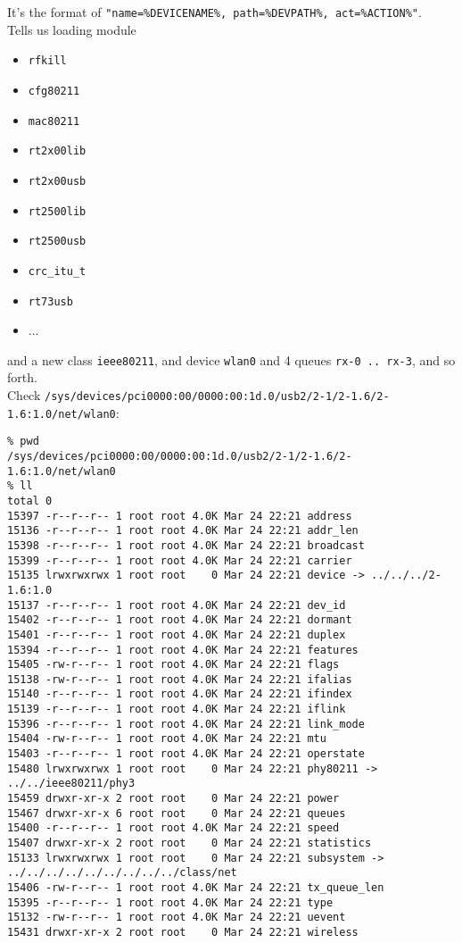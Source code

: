 \documentclass[a4paper]{report}
\begin{document}
It's the format of {\tt "name=\%DEVICENAME\%, path=\%DEVPATH\%, act=\%ACTION\%"}.\\
Tells us loading module 
\begin{itemize}
    \item {\tt rfkill}
    \item {\tt cfg80211}
    \item {\tt mac80211}
    \item {\tt rt2x00lib}
    \item {\tt rt2x00usb}
    \item {\tt rt2500lib}
    \item {\tt rt2500usb}
    \item {\tt crc\_itu\_t}
    \item {\tt rt73usb}
    \item ...
\end{itemize}
and a new class {\tt ieee80211}, and device {\tt wlan0} and 4 queues {\tt rx-0 .. rx-3}, and so forth.\\
Check {\tt /sys/devices/pci0000:00/0000:00:1d.0/usb2/2-1/2-1.6/2-1.6:1.0/net/wlan0}:
\begin{lstlisting}
% pwd
/sys/devices/pci0000:00/0000:00:1d.0/usb2/2-1/2-1.6/2-1.6:1.0/net/wlan0
% ll
total 0
15397 -r--r--r-- 1 root root 4.0K Mar 24 22:21 address
15136 -r--r--r-- 1 root root 4.0K Mar 24 22:21 addr_len
15398 -r--r--r-- 1 root root 4.0K Mar 24 22:21 broadcast
15399 -r--r--r-- 1 root root 4.0K Mar 24 22:21 carrier
15135 lrwxrwxrwx 1 root root    0 Mar 24 22:21 device -> ../../../2-1.6:1.0
15137 -r--r--r-- 1 root root 4.0K Mar 24 22:21 dev_id
15402 -r--r--r-- 1 root root 4.0K Mar 24 22:21 dormant
15401 -r--r--r-- 1 root root 4.0K Mar 24 22:21 duplex
15394 -r--r--r-- 1 root root 4.0K Mar 24 22:21 features
15405 -rw-r--r-- 1 root root 4.0K Mar 24 22:21 flags
15138 -rw-r--r-- 1 root root 4.0K Mar 24 22:21 ifalias
15140 -r--r--r-- 1 root root 4.0K Mar 24 22:21 ifindex
15139 -r--r--r-- 1 root root 4.0K Mar 24 22:21 iflink
15396 -r--r--r-- 1 root root 4.0K Mar 24 22:21 link_mode
15404 -rw-r--r-- 1 root root 4.0K Mar 24 22:21 mtu
15403 -r--r--r-- 1 root root 4.0K Mar 24 22:21 operstate
15480 lrwxrwxrwx 1 root root    0 Mar 24 22:21 phy80211 -> ../../ieee80211/phy3
15459 drwxr-xr-x 2 root root    0 Mar 24 22:21 power
15467 drwxr-xr-x 6 root root    0 Mar 24 22:21 queues
15400 -r--r--r-- 1 root root 4.0K Mar 24 22:21 speed
15407 drwxr-xr-x 2 root root    0 Mar 24 22:21 statistics
15133 lrwxrwxrwx 1 root root    0 Mar 24 22:21 subsystem -> ../../../../../../../../../class/net
15406 -rw-r--r-- 1 root root 4.0K Mar 24 22:21 tx_queue_len
15395 -r--r--r-- 1 root root 4.0K Mar 24 22:21 type
15132 -rw-r--r-- 1 root root 4.0K Mar 24 22:21 uevent
15431 drwxr-xr-x 2 root root    0 Mar 24 22:21 wireless
\end{lstlisting}
\end{document}
